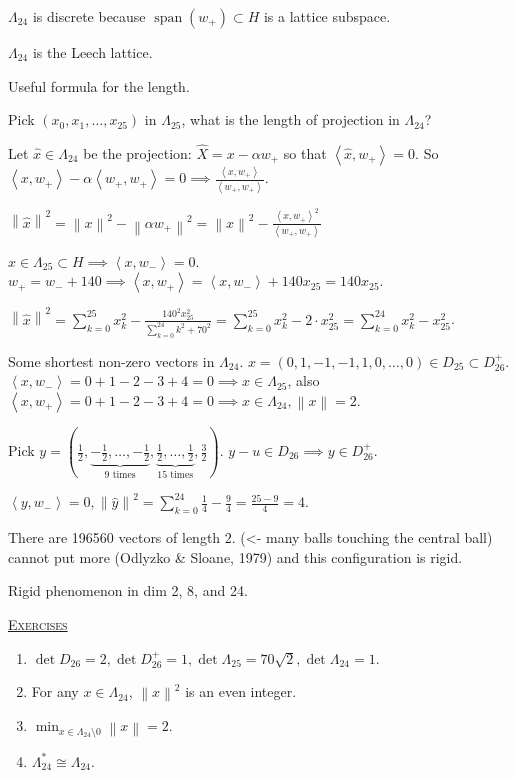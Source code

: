 \documentclass{report}
\newcommand{\inner}[2]{\left\langle #1, #2\right\rangle}
\newcommand{\norm}[1]{\left\| #1 \right\|}
\newcommand{\fancyem}[1]{\underline{\textsc{#1}}}
\theoremstyle{definition}
\theoremstyle{remark}
\numberwithin{equation}{section}
\begin{document}
$\Lambda_{24}$ is discrete because $\operatorname{span}(w_+) \subset H$ is a lattice subspace.

$\Lambda_{24}$ is the Leech lattice.

Useful formula for the length.

Pick $(x_0, x_1, \ldots, x_{25})$ in $\Lambda_{25}$, what is the length of projection in $\Lambda_{24}$?

Let $\widehat{x} \in \Lambda_{24}$ be the projection: $\widehat{X} = x - \alpha w_+$ so that $\inner{\widehat{x}}{w_+} = 0$. So $\inner{x}{w_+} - \alpha\inner{w_+}{w_+} = 0 \implies \frac{\inner{x}{w_+}}{\inner{w_+}{w_+}}$.

$\norm{\widehat{x}}^2 = \norm{x}^2 - \norm{\alpha w_+}^2 = \norm{x}^2 - \frac{\inner{x}{w_+}^2}{\inner{w_+}{w_+}}$

$x \in \Lambda_{25} \subset H \implies \inner{x}{w_-} = 0$. $w_+ = w_- + 140 \implies \inner{x}{w_+} = \inner{x}{w_-} + 140 x_{25} = 140 x_{25}$.

$\norm{\widehat{x}}^2 = \sum_{k=0}^{25} x_k^2 - \frac{140^2x^2_{25}}{\sum_{k=0}^{24} k^2 + 70^2} = \sum_{k=0}^{25} x_k^2 - 2 \cdot x^2_{25} = \sum_{k=0}^{24}x_k^2  - x_{25}^2$.


Some shortest non-zero vectors in $\Lambda_{24}$.
$x = (0, 1, -1, -1, 1, 0, \ldots, 0) \in D_{25} \subset D_{26}^+$.
$\inner{x}{w_-} = 0 + 1 - 2 - 3 + 4  = 0 \implies x \in \Lambda_{25}$, also 
$\inner{x}{w_+} = 0 + 1 - 2 - 3 + 4  = 0 \implies x \in \Lambda_{24}, \norm{x} = 2$.

Pick $y = \left(\frac{1}{2}, \underbrace{-\frac{1}{2}, \ldots, -\frac{1}{2}}_{9 \text{ times}}, \underbrace{\frac{1}{2}, \ldots, \frac{1}{2}}_{15 \text{ times}}, \frac{3}{2}\right)$. $y - u \in D_{26} \implies y \in D_{26}^+$.

$\inner{y}{w_-} = 0, \norm{\widehat{y}}^2 = \sum_{k=0}^{24} \frac{1}{4} - \frac{9}{4} = \frac{25 - 9}{4} = 4$.

There are 196560 vectors of length $2$. (<- many balls touching the central ball)
cannot put more (Odlyzko \& Sloane, 1979) and this configuration is rigid.

Rigid phenomenon in dim 2, 8, and 24.

\fancyem{Exercises}
\begin{enumerate}
    \item $\det D_{26} = 2, \det D_{26}^+ = 1, \det \Lambda_{25} = 70\sqrt{2}, \det \Lambda_{24} = 1$.
    \item For any $x \in \Lambda_{24}$, $\norm{x}^2$ is an even integer.
    \item $\min_{x \in \Lambda_{24} \setminus 0} \norm{x} = 2$.
    \item $\Lambda^*_{24} \cong \Lambda_{24}$.
\end{enumerate}
\end{document}
